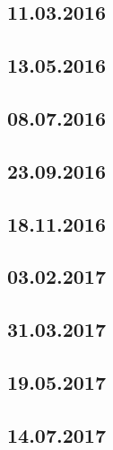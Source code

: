 \documentclass[a4paper,12p]{article}
\begin{document}
	\newpage
	\subsection{11.03.2016}
	
	
	
	
	
	\subsection{13.05.2016}
	
	
	
	
	\newpage
	\subsection{08.07.2016}
	
	
	
	
	\newpage
	\subsection{23.09.2016}
	
	
	
	
	\newpage
	\subsection{18.11.2016}
	
	
	
	
	\subsection{03.02.2017}
	
	
	
	
	\subsection{31.03.2017}
	
	
	
	
	\subsection{19.05.2017}
	
	
	
	\subsection{14.07.2017}
\end{document}
